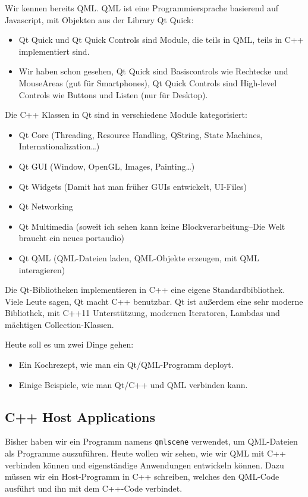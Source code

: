 \documentclass[a4paper]{article}
\begin{document}
Wir kennen bereits QML. QML ist eine Programmiersprache basierend auf Javascript, mit Objekten aus der Library Qt Quick:
\begin{itemize}
\item Qt Quick und Qt Quick Controls sind Module, die teils in QML, teils in C++ implementiert sind.
\item Wir haben schon gesehen, Qt Quick sind Basiscontrols wie Rechtecke und MouseAreas (gut für Smartphones), Qt Quick Controls sind High-level Controls wie Buttons und Listen (nur für Desktop).
\end{itemize}

Die C++ Klassen in Qt sind in verschiedene Module kategorisiert:
\begin{itemize}
\item Qt Core (Threading, Resource Handling, QString, State Machines, Internationalization\ldots{})
\item Qt GUI (Window, OpenGL, Images, Painting\ldots{})
\item Qt Widgets (Damit hat man früher GUIs entwickelt, UI-Files)
\item Qt Networking
\item Qt Multimedia (soweit ich sehen kann keine Blockverarbeitung--Die Welt braucht ein neues portaudio)
\item Qt QML (QML-Dateien laden, QML-Objekte erzeugen, mit QML interagieren)
\end{itemize}

Die Qt-Bibliotheken implementieren in C++ eine eigene Standardbibliothek. Viele Leute sagen, Qt macht C++ benutzbar. Qt ist außerdem eine sehr moderne Bibliothek, mit C++11 Unterstützung, modernen Iteratoren, Lambdas und mächtigen Collection-Klassen.

Heute soll es um zwei Dinge gehen:
\begin{itemize}
\item Ein Kochrezept, wie man ein Qt/QML-Programm deployt.
\item Einige Beispiele, wie man Qt/C++ und QML verbinden kann.
\end{itemize}
\subsection{C++ Host Applications}
\label{sec-2-2}
Bisher haben wir ein Programm namens \verb~qmlscene~ verwendet, um QML-Dateien als Programme auszuführen. Heute wollen wir sehen, wie wir QML mit C++ verbinden können und eigenständige Anwendungen entwickeln können. Dazu müssen wir ein Host-Programm in C++ schreiben, welches den QML-Code ausführt und ihn mit dem C++-Code verbindet.
\end{document}
